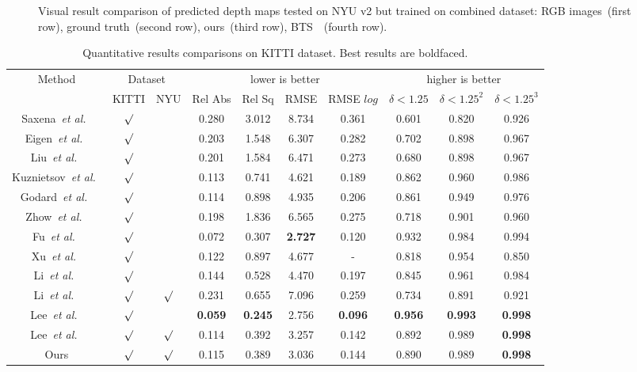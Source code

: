\documentclass{svjour3}                     %
\begin{document}
\begin{figure}[t]
{\begin{minipage}[t]{0.15\linewidth}
  \end{minipage}%
  }
  \centering
  \caption{Visual result comparison of predicted depth maps tested on NYU v2 but trained on combined dataset: RGB images~(first row), 
  ground truth~(second row), ours~(third row), BTS~\cite{bts}~(fourth row).}
  \label{nyu visualization result}
  \end{figure}
\begin{table}[!h]
  \centering
  \caption{Quantitative results comparisons on KITTI dataset.
  Best results are boldfaced.}
  \label{tab:kitti quantitative result}
  \begin{tabular}{c|cc|cccc|ccc}
    \toprule
    \multirow{2}{*}{Method} & \multicolumn{2}{c|}{Dataset}& \multicolumn{4}{c|}{lower is better}&\multicolumn{3}{c}{higher is better}\\
    &KITTI&NYU& Rel Abs & Rel Sq & RMSE& RMSE $log$ &$\delta<1.25$ &$\delta<1.25^2$ & $\delta<1.25^3$ \\   
    \midrule
    Saxena~\textit{et al.}~\cite{Make3D}&$\surd $&&0.280&3.012&
    8.734&0.361&0.601&0.820&0.926\\
    Eigen~\textit{et al.}~\cite{eigen2014depth}&$\surd$&&0.203&
    1.548&6.307&0.282&0.702&0.898&0.967\\
    Liu~\textit{et al.}~\cite{liu2015learning}&$\surd$&&0.201&1.584&6.471&0.273&0.680&0.898&0.967\\
    Kuznietsov~\textit{et al.}~\cite{Kuznietsov2017}&$\surd$&&0.113&0.741&4.621&0.189&0.862&0.960&0.986\\
    Godard~\textit{et al.}~\cite{godard2017unsupervised}&$\surd$&&0.114&0.898&4.935&0.206&0.861&0.949&0.976\\
    Zhow~\textit{et al.}~\cite{zhou2017unsupervised}&$\surd$&&
    0.198&1.836&6.565&0.275&0.718&0.901&0.960\\
    Fu~\textit{et al.}~\cite{FuCVPR18-DORN}&$\surd$&&0.072&0.307&\textbf{2.727}&0.120&0.932&0.984&0.994\\
    Xu~\textit{et al.}~\cite{xu2018structured}&$\surd$&&0.122&0.897&4.677&-&0.818&0.954&0.850\\
    \hline
    Li~\textit{et al.}~\cite{DABC}&$\surd$&&0.144&0.528&4.470&0.197&0.845&0.961&0.984\\
    Li~\textit{et al.}~\cite{DABC}&$\surd$&$\surd$&0.231&0.655&7.096&0.259&0.734&0.891&0.921\\
    \hline
    Lee~\textit{et al.}~\cite{bts}&$\surd$&&\textbf{0.059}&\textbf{0.245}&2.756&\textbf{0.096}&\textbf{0.956}&\textbf{0.993}&\textbf{0.998}\\
    Lee~\textit{et al.}~\cite{bts}&$\surd$&$\surd$&0.114&0.392&3.257&0.142&0.892&0.989&\textbf{0.998}\\
    Ours&$\surd$&$\surd$&0.115&0.389&3.036&0.144&0.890&0.989&\textbf{0.998}\\
    \bottomrule
  \end{tabular}
\end{table}
\end{document}
